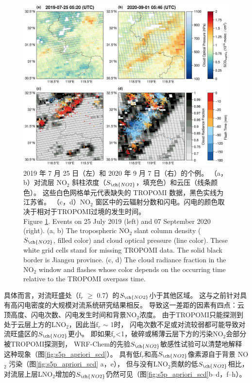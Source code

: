 \begin{figure}[!htbp]
    \centering
    \includegraphics[width=12cm]{./figures/china_flash_scd.png}
    \caption{
    2019 年 7 月 25 日（左）和 2020 年 9 月 7 日（右）的个例。
    （a，b）对流层 NO$_2$ 斜柱浓度（$S_{\ch{NO2}}$，填充色）和云压（线条颜色）。
    这些白色网格单元代表缺失的 TROPOMI 数据，黑色实线为江苏省。
    （c，d）NO$_2$ 窗区中的云辐射分数和闪电。闪电的颜色取决于相对于TROPOMI过境的发生时间。\\
    Figure \ref{fig:china_flash_scd}. Events on 25 July 2019 (left) and 07 September 2020 (right).
    (a, b) The tropospheric NO$_2$ slant column density ($S_{\ch{NO2}}$, filled color) and cloud optical pressure (line color).
    These white grid cells stand for missing TROPOMI data.
    The solid black border is Jiangsu province.
    (c, d) The cloud radiance fraction in the NO$_2$ window and flashes whose color depends on the occurring time relative to the TROPOMI overpass time.
    }
    \label{fig:china_flash_scd}
\end{figure}

具体而言，对流旺盛处（f$_r$ $\geq$ 0.7）的$S_{\ch{NO2}}$小于其他区域。
这与之前针对具有高闪电密度的大规模对流系统研究结果相反\citep{Beirle.2009}。
导致这一差距的因素有四点：云顶高度、闪电次数、闪电发生时间和背景NO$_2$浓度。
由于TROPOMI只能探测到处于云层上方的LNO$_2$，因此当f$_r$ $\sim$ 1时，
闪电次数不足或对流较弱都可能导致对流旺盛区的$S_{\ch{NO2}}$更小。
即如果f$_r$<1，破碎或稀薄云层下方的污染NO$_2$会部分被TROPOMI探测到，
WRF-Chem的先验$S_{\ch{NO2}}$敏感性试验可以清楚地解释这种现象（图\ref{fig:s5p_apriori_scd}）。
具有低f$_r$和高$S_{\ch{NO2}}$像素源自于背景 NO$_2$ 污染（图\ref{fig:s5p_apriori_scd} a，e），
但与没有LNO$_2$贡献的低$S_{\ch{NO2}}$相比，对流层上层LNO$_2$增加的$S_{\ch{NO2}}$仍然可见（图\ref{fig:s5p_apriori_scd}b--d，f--h）。


